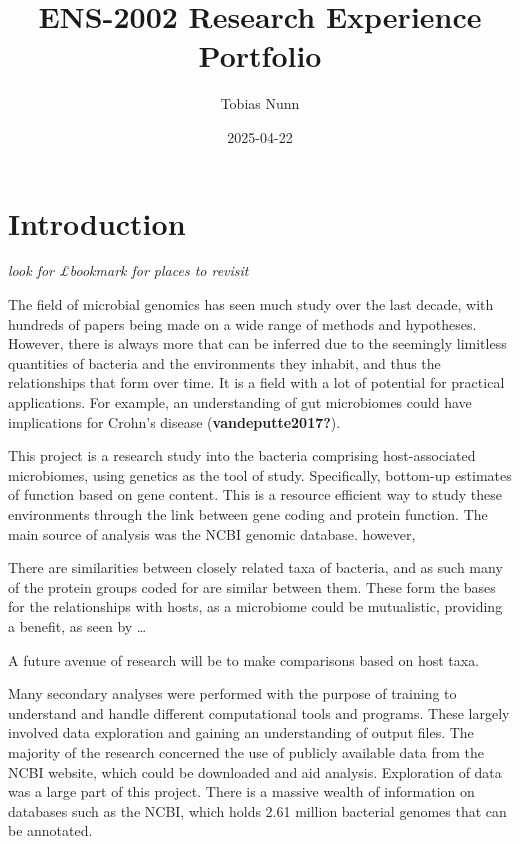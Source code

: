 \documentclass[
  letterpaper,
  DIV=11,
  numbers=noendperiod]{scrreprt}
\title{ENS-2002 Research Experience Portfolio}
\author{Tobias Nunn}
\date{2025-04-22}
\renewcommand*\contentsname{Table of contents}
\newcommand\contentsname{Table of contents}
\begin{document}
\maketitle

\renewcommand*\contentsname{Table of contents}
{
\hypersetup{linkcolor=}
\setcounter{tocdepth}{2}
\tableofcontents
}


\chapter{Introduction}\label{introduction}

\emph{look for £bookmark for places to revisit}

The field of microbial genomics has seen much study over the last
decade, with hundreds of papers being made on a wide range of methods
and hypotheses. However, there is always more that can be inferred due
to the seemingly limitless quantities of bacteria and the environments
they inhabit, and thus the relationships that form over time. It is a
field with a lot of potential for practical applications. For example,
an understanding of gut microbiomes could have implications for Crohn's
disease (\textbf{vandeputte2017?}).

This project is a research study into the bacteria comprising
host-associated microbiomes, using genetics as the tool of study.
Specifically, bottom-up estimates of function based on gene content.
This is a resource efficient way to study these environments through the
link between gene coding and protein function. The main source of
analysis was the NCBI genomic database. however,

There are similarities between closely related taxa of bacteria, and as
such many of the protein groups coded for are similar between them.
These form the bases for the relationships with hosts, as a microbiome
could be mutualistic, providing a benefit, as seen by \ldots{}

A future avenue of research will be to make comparisons based on host
taxa.

Many secondary analyses were performed with the purpose of training to
understand and handle different computational tools and programs. These
largely involved data exploration and gaining an understanding of output
files. The majority of the research concerned the use of publicly
available data from the NCBI website, which could be downloaded and aid
analysis. Exploration of data was a large part of this project. There is
a massive wealth of information on databases such as the NCBI, which
holds 2.61 million bacterial genomes that can be annotated.
\end{document}
